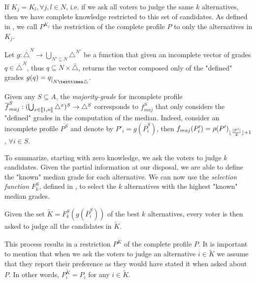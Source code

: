 If $K_j=K_l, \forall j,l\in N$, i.e. if we ask all voters to judge the same $k$ alternatives, then we have complete knowledge restricted to this set of candidates. As defined in , we call $P^{K_j}$ the restriction of the complete profile $P$ to only the alternatives in $K_j$.

Let $g:\overline{\triangle}^N\rightarrow \bigcup_{N' \subseteq N}\triangle^{N'}$ be a function that given an incomplete vector of grades $q \in \overline{\triangle}^N$, thus $q \subseteq N × \bar{\triangle}$, returns the vector composed only of the "defined" grades $g(q) = \restr{q}{N × \triangle}$.


Given any $S \subseteq A$, the \emph{majority-grade} for incomplete profile $\overline{f}^S_{maj}: (\bigcup_{x \in \llbracket1,n\rrbracket}\triangle^{x})^S \rightarrow \triangle^S$ corresponds to $f^S_{maj}$ that only considers the "defined" grades in the computation of the median. Indeed, consider an incomplete profile $\overline{P^S}$ and denote by $P'_i=g(\overline{P}^S_i)$, then ${f}_{maj}(P'_i) = \rho(P')_{\lfloor\frac{\lvert P'\rvert}{2}\rfloor + 1}$, $\forall i \in S$.

To summarize, starting with zero knowledge, we ask the voters to judge $k$ candidates. Given the partial information at our disposal, we are able to define the "known" median grade for each alternative. We can now use the \emph{selection function} $F^S_k$, defined in , to select the $k$ alternatives with the highest "known" median grades.

Given the set $\tilde{K}=F^S_k(g(\overline{P}^S_i))$ of the best $k$ alternatives, every voter is then asked to judge all the candidates in $\tilde{K}$. 

This process results in a restriction $P^{\tilde{K}}$ of the complete profile $P$. It is important to mention that when we ask the voters to judge an alternative $i\in \tilde{K}$ we assume that they report their preference as they would have stated it when asked about $P$. In other words, $P^{\tilde{K}}_{i} = P_i$ for any $i \in \tilde{K}$.

